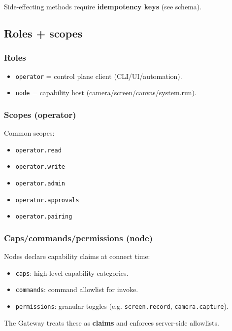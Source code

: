 Side-effecting methods require \textbf{idempotency keys} (see schema).

\subsection{Roles + scopes}


\subsubsection{Roles}


\begin{itemize}
  \item \texttt{operator} = control plane client (CLI/UI/automation).
  \item \texttt{node} = capability host (camera/screen/canvas/system.run).
\end{itemize}


\subsubsection{Scopes (operator)}


Common scopes:

\begin{itemize}
  \item \texttt{operator.read}
  \item \texttt{operator.write}
  \item \texttt{operator.admin}
  \item \texttt{operator.approvals}
  \item \texttt{operator.pairing}
\end{itemize}


\subsubsection{Caps/commands/permissions (node)}


Nodes declare capability claims at connect time:

\begin{itemize}
  \item \texttt{caps}: high-level capability categories.
  \item \texttt{commands}: command allowlist for invoke.
  \item \texttt{permissions}: granular toggles (e.g. \texttt{screen.record}, \texttt{camera.capture}).
\end{itemize}


The Gateway treats these as \textbf{claims} and enforces server-side allowlists.

